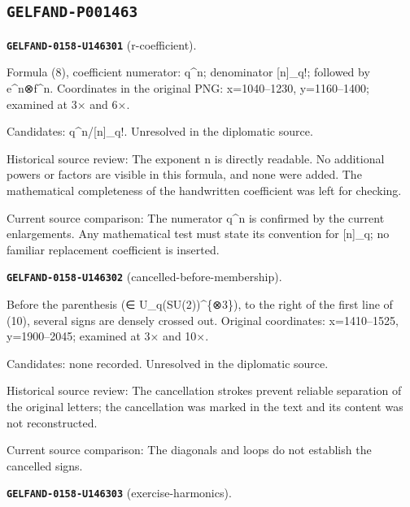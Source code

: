 \subsection*{\texttt{GELFAND-P001463}}
\par\noindent\leavevmode{}\label{GELFAND-0158-U146301}\label{GELFAND-P001463:r-coefficient}\textbf{\texttt{GELFAND-0158-U146301}} (r-coefficient).\nopagebreak[4]\par
Formula (8), coefficient numerator: q\textasciicircum{}n; denominator [n]\_q!; followed by e\textasciicircum{}n⊗f\textasciicircum{}n. Coordinates in the original PNG: x=1040–1230, y=1160–1400; examined at 3× and 6×.\par
Candidates: q\textasciicircum{}n/[n]\_q!. Unresolved in the diplomatic source.\par
Historical source review: The exponent n is directly readable. No additional powers or factors are visible in this formula, and none were added. The mathematical completeness of the handwritten coefficient was left for checking.\par
Current source comparison: The numerator q\textasciicircum{}n is confirmed by the current enlargements. Any mathematical test must state its convention for [n]\_q; no familiar replacement coefficient is inserted.\par\medskip
\par\noindent\leavevmode{}\label{GELFAND-0158-U146302}\label{GELFAND-P001463:cancelled-before-membership}\textbf{\texttt{GELFAND-0158-U146302}} (cancelled-before-membership).\nopagebreak[4]\par
Before the parenthesis (∈ U\_q(SU(2))\textasciicircum{}\{⊗3\}), to the right of the first line of (10), several signs are densely crossed out. Original coordinates: x=1410–1525, y=1900–2045; examined at 3× and 10×.\par
Candidates: none recorded. Unresolved in the diplomatic source.\par
Historical source review: The cancellation strokes prevent reliable separation of the original letters; the cancellation was marked in the text and its content was not reconstructed.\par
Current source comparison: The diagonals and loops do not establish the cancelled signs.\par\medskip
\par\noindent\leavevmode{}\label{GELFAND-0158-U146303}\label{GELFAND-P001463:exercise-harmonics}\textbf{\texttt{GELFAND-0158-U146303}} (exercise-harmonics).\nopagebreak[4]\par

